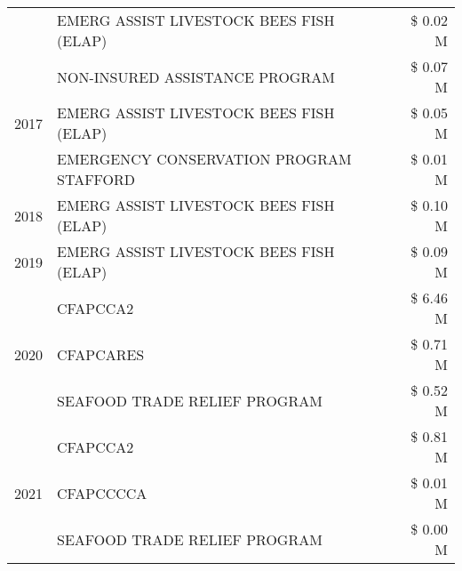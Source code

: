 \begin{tabular}{llr}
 & EMERG ASSIST LIVESTOCK BEES FISH (ELAP)       & \$ 0.02 M \\
\cline{1-3}
\multirow[t]{3}{*}{2017} & NON-INSURED ASSISTANCE PROGRAM & \$ 0.07 M \\
 & EMERG ASSIST LIVESTOCK BEES FISH (ELAP) & \$ 0.05 M \\
 & EMERGENCY CONSERVATION PROGRAM STAFFORD & \$ 0.01 M \\
\cline{1-3}
2018 & EMERG ASSIST LIVESTOCK BEES FISH (ELAP) & \$ 0.10 M \\
\cline{1-3}
2019 & EMERG ASSIST LIVESTOCK BEES FISH (ELAP) & \$ 0.09 M \\
\cline{1-3}
\multirow[t]{3}{*}{2020} & CFAPCCA2 & \$ 6.46 M \\
 & CFAPCARES & \$ 0.71 M \\
 & SEAFOOD TRADE RELIEF PROGRAM & \$ 0.52 M \\
\cline{1-3}
\multirow[t]{3}{*}{2021} & CFAPCCA2 & \$ 0.81 M \\
 & CFAPCCCCA & \$ 0.01 M \\
 & SEAFOOD TRADE RELIEF PROGRAM & \$ 0.00 M \\
\cline{1-3}
\bottomrule
\end{tabular}
